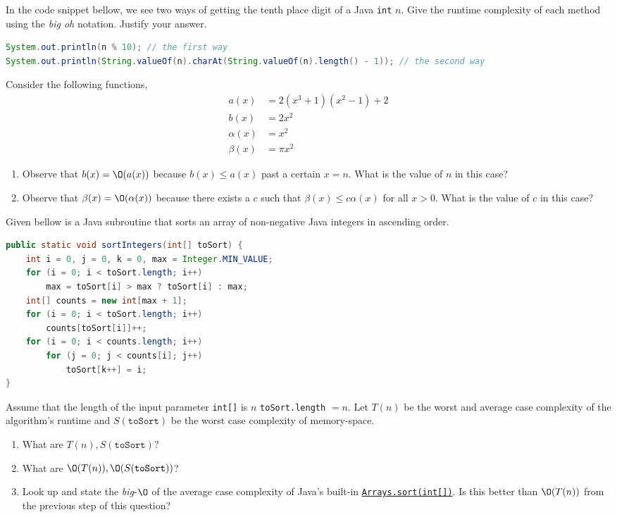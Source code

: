 \documentclass{homework}
\begin{document}
\question In the code snippet bellow, we see two ways of getting the
tenth place digit of a Java \texttt{int} $n$. Give the runtime
complexity of each method using the \textit{big oh} notation. Justify
your answer.
\begin{lstlisting}[language=java]
System.out.println(n % 10); // the first way
System.out.println(String.valueOf(n).charAt(String.valueOf(n).length() - 1)); // the second way
\end{lstlisting}

\question Consider the following functions,
\begin{align*}
  a(x)      & = 2(x^3+1)(x^2-1)+2 \\
  b(x)      & = 2x^2              \\
  \alpha(x) & = x^2               \\
  \beta(x)  & = \pi x^2
\end{align*}
\begin{enumerate}
  \item Observe that $b(x) = \O(a(x))$ because $b(x) \leq a(x)$ past
        a certain $x=n$. What is the value of $n$ in this case?
  \item Observe that $\beta(x) = \O(\alpha(x))$ because there exists
        a $c$ such that $\beta(x) \leq c\alpha(x)$ for all $x > 0$. What
        is the value of $c$ in this case?
\end{enumerate}

\question Given bellow is a Java subroutine that sorts an array of
non-negative Java integers in ascending order.
\begin{lstlisting}[language=java]
public static void sortIntegers(int[] toSort) {
    int i = 0, j = 0, k = 0, max = Integer.MIN_VALUE;
    for (i = 0; i < toSort.length; i++)
        max = toSort[i] > max ? toSort[i] : max;
    int[] counts = new int[max + 1];
    for (i = 0; i < toSort.length; i++)
        counts[toSort[i]]++;
    for (i = 0; i < counts.length; i++)
        for (j = 0; j < counts[i]; j++)
            toSort[k++] = i;
}
\end{lstlisting}

Assume that the length of the input parameter \texttt{int[]} is $n$
\ie \texttt{toSort.length} $= n$. Let $T(n)$ be the worst and average
case complexity of the algorithm's runtime and $S(\texttt{toSort})$ be the worst
case complexity of memory-space.

\begin{enumerate}
  \item What are $T(n), S(\texttt{toSort})$?
  \item What are $\O(T(n)), \O(S(\texttt{toSort}))$?
  \item Look up and state the \textit{big}-$\O$ of the average case
        complexity of Java's built-in
        \href{https://tinyurl.com/jw75mfa}{\texttt{Arrays.sort(int[])}}. Is
        this better than $\O(T(n))$ from the previous step of this question?
\end{enumerate}
\end{document}
